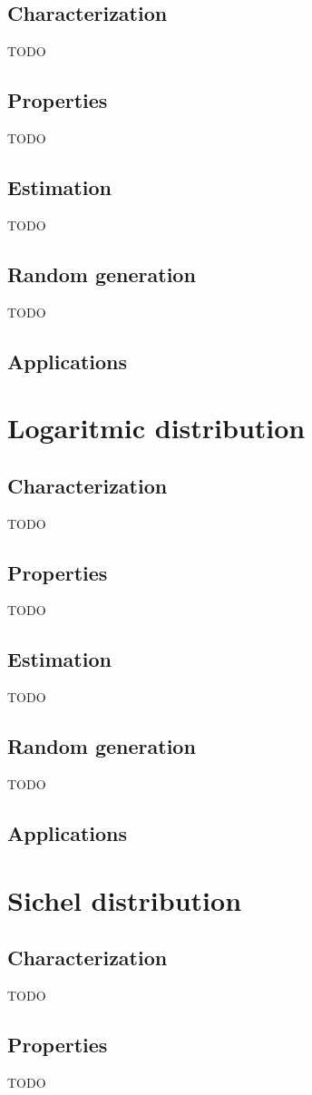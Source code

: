 \subsection{Characterization}
TODO
\subsection{Properties}
TODO
\subsection{Estimation}
TODO
\subsection{Random generation}
TODO
\subsection{Applications}


\section{Logaritmic distribution}
\subsection{Characterization}
TODO
\subsection{Properties}
TODO
\subsection{Estimation}
TODO
\subsection{Random generation}
TODO
\subsection{Applications}

\section{Sichel distribution}
\subsection{Characterization}
TODO
\subsection{Properties}
TODO
